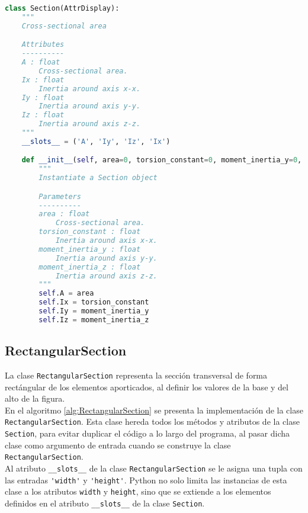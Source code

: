 \begin{lstlisting}[language=Python,caption=Clase \texttt{Section} implementada en el archivo \texttt{primitives.py}.,label=alg:Section, frame=single]
class Section(AttrDisplay):
    """
    Cross-sectional area

    Attributes
    ----------
    A : float
        Cross-sectional area.
    Ix : float
        Inertia around axis x-x.
    Iy : float
        Inertia around axis y-y.
    Iz : float
        Inertia around axis z-z.
    """
    __slots__ = ('A', 'Iy', 'Iz', 'Ix')

    def __init__(self, area=0, torsion_constant=0, moment_inertia_y=0, moment_inertia_z=0):
        """
        Instantiate a Section object

        Parameters
        ----------
        area : float
            Cross-sectional area.
        torsion_constant : float
            Inertia around axis x-x.
        moment_inertia_y : float
            Inertia around axis y-y.
        moment_inertia_z : float
            Inertia around axis z-z.
        """
        self.A = area
        self.Ix = torsion_constant
        self.Iy = moment_inertia_y
        self.Iz = moment_inertia_z
\end{lstlisting}

\subsection{RectangularSection}
La clase \verb|RectangularSection| representa la sección transversal de forma rectángular de los elementos aporticados, al definir los valores de la base y del alto de la figura.\\

En el algoritmo \ref{alg:RectangularSection} se presenta la implementación de la clase \verb|RectangularSection|. Esta clase hereda todos los métodos y atributos de la clase \verb|Section|, para evitar duplicar el código a lo largo del programa, al pasar dicha clase como argumento de entrada cuando se construye la clase \verb|RectangularSection|.\\

Al atributo \verb|__slots__| de la clase \verb|RectangularSection| se le asigna una tupla con las entradas \verb|'width'| y \verb|'height'|. Python no solo limita las instancias de esta clase a los atributos \verb|width| y \verb|height|, sino que se extiende a los elementos definidos en el atributo \verb|__slots__| de la clase \verb|Section|.\\

